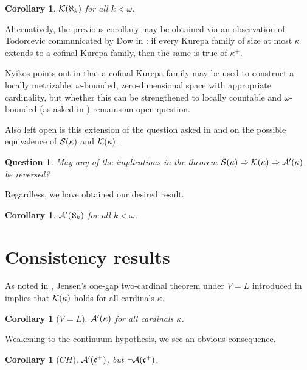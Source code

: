 \documentclass{amsart}
\theoremstyle{plain}
\newtheorem{corollary}[theorem]{Corollary}
\newtheorem{question}[theorem]{Question}
\theoremstyle{definition}
\theoremstyle{remark}
\theoremstyle{plain}
\theoremstyle{definition}
\theoremstyle{remark}
\begin{document}
  \begin{corollary}
    \(\mathcal{K}(\aleph_k)\) for all \(k<\omega\).
  \end{corollary}

  Alternatively, the previous corollary may be obtained
  via an observation of Todorcevic
  communicated by Dow in \cite{MR1229125}:
  if every Kurepa family of size at most \(\kappa\)
  extends to a cofinal Kurepa family, then the same is true of \(\kappa^+\).

  Nyikos points out in \cite{NYIKOSKUREPA} that a cofinal Kurepa family may
  be used to construct a locally metrizable, \(\omega\)-bounded,
  zero-dimensional space with appropriate cardinality,
  but whether this can be
  strengthened to locally countable and \(\omega\)-bounded (as asked in
  \cite{MR539228}) remains an open question.

  Also left open is this extension of the question asked in \cite{NYIKOSKUREPA}
  and \cite{MR539228} on the possible equivalence of \(\mathcal{S}(\kappa)\)
  and \(\mathcal{K}(\kappa)\).

  \begin{question}
    May any of the implications in the theorem
    \(\mathcal{S}(\kappa)\Rightarrow\mathcal{K}(\kappa)\Rightarrow\mathcal{A}'(\kappa)\)
    be reversed?
  \end{question}

  Regardless, we have obtained our desired result.

  \begin{corollary}
    \(\mathcal{A}'(\aleph_k)\) for all \(k<\omega\).
  \end{corollary}




  \section{Consistency results}

  As noted in \cite{MR1229125}, Jensen's one-gap two-cardinal theorem under
  \(V=L\) introduced in \cite{MR0309729} implies that \(\mathcal{K}(\kappa)\)
  holds for all cardinals \(\kappa\).

  \begin{corollary}[\(V=L\)]
    \(\mathcal{A}'(\kappa)\) for all cardinals \(\kappa\).
  \end{corollary}

  Weakening to the continuum hypothesis, we see an obvious consequence.

  \begin{corollary}[\(CH\)]
    \(\mathcal{A}'(\mathfrak{c}^+)\), but \(\neg\mathcal{A}(\mathfrak{c}^+)\).
  \end{corollary}
\end{document}
